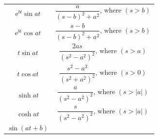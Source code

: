 \documentclass[
]{book}
\begin{document}
\begin{longtable}[]{@{}ll@{}}
\begin{minipage}[t]{0.42\columnwidth}
\[\mathrm{e}^{bt} \sin{at}\]\strut
\end{minipage} & \begin{minipage}[t]{0.52\columnwidth}\raggedright
\[\frac{a}{\left(s - b \right)^2 + a^2} \text{, where } \left(s >  b \right) \]\strut
\end{minipage}\tabularnewline
\begin{minipage}[t]{0.42\columnwidth}\raggedright
\[\mathrm{e}^{bt} \cos{at}\]\strut
\end{minipage} & \begin{minipage}[t]{0.52\columnwidth}\raggedright
\[\frac{s-b}{\left(s - b \right)^2 + a^2} \text{, where } \left(s >  b \right) \]\strut
\end{minipage}\tabularnewline
\begin{minipage}[t]{0.42\columnwidth}\raggedright
\[t \sin{at}\]\strut
\end{minipage} & \begin{minipage}[t]{0.52\columnwidth}\raggedright
\[\frac{2as}{\left(s^2  - a^2\right)^2} \text{, where } \left(s >  a \right) \]\strut
\end{minipage}\tabularnewline
\begin{minipage}[t]{0.42\columnwidth}\raggedright
\[t \cos{at}\]\strut
\end{minipage} & \begin{minipage}[t]{0.52\columnwidth}\raggedright
\[\frac{s^2  - a^2}{\left(s^2  + a^2\right)^2} \text{, where } \left(s >  0 \right) \]\strut
\end{minipage}\tabularnewline
\begin{minipage}[t]{0.42\columnwidth}\raggedright
\[\sinh{at}\]\strut
\end{minipage} & \begin{minipage}[t]{0.52\columnwidth}\raggedright
\[\frac{a}{\left(s^2  - a^2\right)^2} \text{, where } \left(s >  \lvert a \rvert \right) \]\strut
\end{minipage}\tabularnewline
\begin{minipage}[t]{0.42\columnwidth}\raggedright
\[\cosh{at}\]\strut
\end{minipage} & \begin{minipage}[t]{0.52\columnwidth}\raggedright
\[\frac{s}{\left(s^2  - a^2\right)^2} \text{, where } \left(s >  \lvert a \rvert \right) \]\strut
\end{minipage}\tabularnewline
\begin{minipage}[t]{0.42\columnwidth}\raggedright
\[\sin \left(at + b\right)\]\strut
\end{minipage} & \begin{minipage}[t]{0.52\columnwidth}\raggedright

\end{minipage}
\end{longtable}
\end{document}
